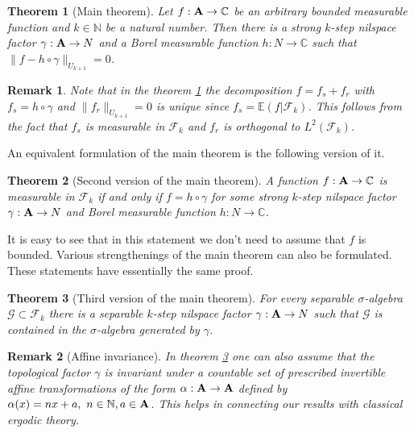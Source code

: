 \documentclass [11pt] {article}
\newtheorem{theorem}{Theorem}
\newtheorem{remark}{Remark}[section]
\def\bA{{\bf A}}
\begin{document}
\begin{theorem}[Main theorem]\label{main} Let $f:\bA\rightarrow\mathbb{C}$ be an arbitrary bounded measurable function and $k\in\mathbb{N}$ be a natural number. Then there is a strong $k$-step nilspace factor $\gamma:\bA\rightarrow N$ and a Borel measurable function $h:N\rightarrow\mathbb{C}$ such that $\|f-h\circ\gamma\|_{U_{k+1}}=0$.
\end{theorem}

\begin{remark} Note that in the theorem \ref{main} the decomposition $f=f_s+f_r$ with $f_s=h\circ\gamma$ and $\|f_r\|_{U_{k+1}}=0$ is unique since $f_s=\mathbb{E}(f|\mathcal{F}_k)$. This follows from the fact that $f_s$ is measurable in $\mathcal{F}_k$ and $f_r$ is orthogonal to $L^2(\mathcal{F}_k)$.
\end{remark}

An equivalent formulation of the main theorem is the following version of it.

\begin{theorem}[Second version of the main theorem]\label{main2} A function $f:\bA\rightarrow\mathbb{C}$ is measurable in $\mathcal{F}_k$ if and only if $f=h\circ\gamma$ for some strong $k$-step nilspace factor $\gamma:\bA\rightarrow N$ and Borel measurable function $h:N\rightarrow\mathbb{C}$.
\end{theorem}

It is easy to see that in this statement we don't need to assume that $f$ is bounded. Various strengthenings of the main theorem can also be formulated. These statements have essentially the same proof.

\begin{theorem}[Third version of the main theorem]\label{main3} For every separable $\sigma$-algebra $\mathcal{G}\subset\mathcal{F}_k$ there is a separable $k$-step nilspace factor $\gamma:\bA\rightarrow N$ such that $\mathcal{G}$ is contained in the $\sigma$-algebra generated by $\gamma$.
\end{theorem}


\begin{remark}[Affine invariance]  In theorem \ref{main3} one can also assume that the topological factor $\gamma$ is invariant under a countable set of prescribed invertible affine transformations of the form $\alpha:\bA\rightarrow\bA$ defined by $\alpha(x)=nx+a,~n\in\mathbb{N},a\in\bA$. This helps in connecting our results with classical ergodic theory. 
\end{remark}
\end{document}
